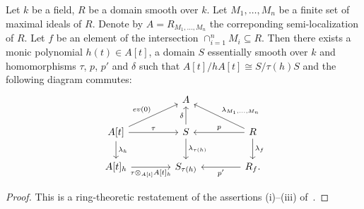 \documentclass[oneside, 11pt]{amsart} \pdfoutput=1
\begin{document}
\begin{theorem}[Panin]
\label{paninthm}
Let $k$ be a field, $R$ be a domain smooth over $k$. Let $M_1,\ldots, M_n$ be a finite set of maximal ideals of $R$. Denote by $A=R_{M_1,\ldots,M_n}$ the correponding semi-localization of $R$. Let $f$ be an element of the intersection  $\cap_{i=1}^nM_i \subseteq R$. Then there exists a monic polynomial $h(t)\in A[t]$, a domain $S$ essentially smooth over $k$ and homomorphisms $\tau$, $p$, $p'$ and $\delta$ such that $A[t]/hA[t]\cong S/\tau(h)S$ and the following diagram commutes:
\begin{equation}\label{eq:panin-diag}
 \begin{tikzcd}[column sep=4em]
   & A & \\ A[t] \ar{d}{\lambda_h} \ar{ru}{ev(0)} \ar{r}{\tau} & S \ar{u}{\delta} \ar{d}{\lambda_{\tau(h)}}  & R \ar{ul}[swap]{\lambda_{M_1,\ldots,M_n}} \ar{d}{\lambda_f} \ar{l}[swap]{p} \\
   A[t]_h \ar{r}[swap]{\tau\otimes_{A[t]}A[t]_h}              & S_{\tau(h)}      & R_f. \ar{l}{p'}\end{tikzcd}
\end{equation}
\end{theorem}
\begin{proof}
 This is a ring-theoretic restatement of the assertions (i)--(iii) of~\cite[Theorem~2.5]{Pa19}.
\end{proof}
\end{document}
